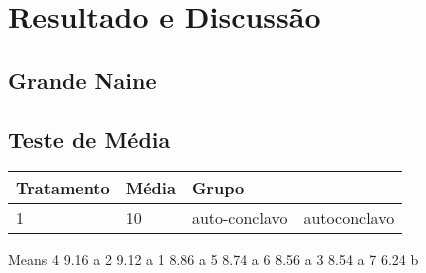 \chapter{Resultado e Discussão}
\section{Grande Naine}

\section{Teste de Média}
  
 
 \begin{table}[htb]
 	\center
 	\footnotesize
 	\begin{tabular}{|p{1.4cm}|p{1cm}|p{3cm}}
 		\hline
 		\textbf{Tratamento} & \textbf{Média}  & \textbf{Grupo}\\
 		 & 10 & auto-conclavo & autoconclavo\\
 		\hline
 	\end{tabular}
 \end{table}
  
  Means 
4  9.16  a   
2  9.12  a   
1  8.86  a   
5  8.74  a   
6  8.56  a   
3  8.54  a   
7  6.24     b